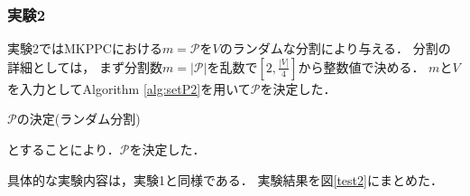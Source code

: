 \documentclass[11pt,dvipdfmx]{jarticle}
\numberwithin{equation}{section}
\begin{document}
        \subsubsection{実験2}
            実験2ではMKPPCにおける$m=\mathcal{P}$を$V$のランダムな分割により与える．
            分割の詳細としては， まず分割数$m=|\mathcal{P}|$を乱数で$[2,\frac{|V|}{4}]$から整数値で決める．
            $m$と$V$を入力としてAlgorithm \ref{alg:setP2}を用いて$\mathcal{P}$を決定した．\par
            \begin{algorithm}
                \caption{$\mathcal{P}$の決定(ランダム分割)}
                \label{alg:setP2}
                \begin{algorithmic}[1]
                        \EndIf
                    \EndWhile
                        \Else
                        \EndIf
                        \EndWhile
                    \EndWhile
                \end{algorithmic}
            \end{algorithm}
            とすることにより．$\mathcal{P}$を決定した．\par
            具体的な実験内容は，実験1と同様である．
            実験結果を図\ref{test2}にまとめた．\par
\end{document}

